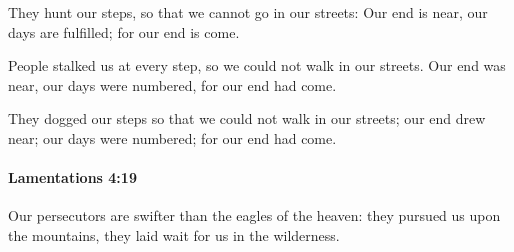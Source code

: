 			\begin{versebox}
					\item[BHS] 
					\item[LXX] 
					\item[ASV] They hunt our steps, so that we cannot go in our streets: Our end is near, our days are fulfilled; for our end is come.
					\item[NIV] People stalked us at every step, so we could not walk in our streets. Our end was near, our days were numbered, for our end had come.
					\item[NRSV] They dogged our steps so that we could not walk in our streets; our end drew near; our days were numbered; for our end had come.
			\end{versebox}

		\paragraph{Lamentations 4:19} %
			\label{LAMENTATIONS-4-19}

			Our persecutors are swifter than the eagles of the heaven: they pursued us upon the mountains, they laid wait for us in the wilderness.

